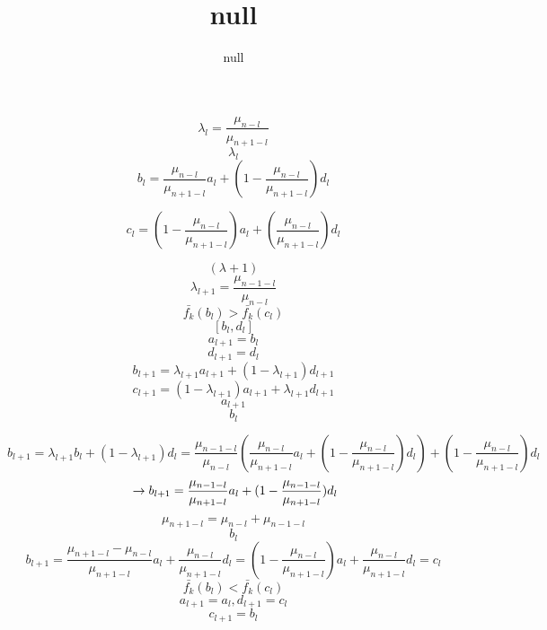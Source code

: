\documentclass{article}
\title{null}
\author{null}
\begin{document}
	\maketitle
	$$\lambda_l=\frac{\mu_{n-l}}{\mu_{n+1-l}}$$
	$$\lambda_l $$
	\begin{equation}
	b_l=\frac{\mu_{n-l}}{\mu_{n+1-l}} a_l+(1-\frac{\mu_{n-l}}{\mu_{n+1-l}})d_l
	\end{equation}
	
	\begin{equation}
	c_l=(1-\frac{\mu_{n-l}}{\mu_{n+1-l}}) a_l+(\frac{\mu_{n-l}}{\mu_{n+1-l}})d_l
	\end{equation}
	
	$$(\lambda+1)$$\newline
	$$\lambda_{l+1}=\frac{\mu_{n-1-l}}{\mu_{n-l}}$$
	$$\bar{f_k}(b_l)>\bar{f_k}(c_l)$$
	$$[b_l,d_l]$$
	$$a_{l+1}=b_l$$
	$$d_{l+1}=d_l$$
	$$b_{l+1}=\lambda_{l+1}a_{l+1}+(1-\lambda_{l+1})d_{l+1}$$
	$$c_{l+1}=(1-\lambda_{l+1})a_{l+1}+\lambda_{l+1}d_{l+1}$$
	$$a_{l+1}$$
	$$b_l$$
	
	$$
	b_{l+1}=\lambda_{l+1} b_l+(1-\lambda_{l+1})d_l=\frac{\mu_{n-1-l}}{\mu_{n-l}}(\frac{\mu_{n-l}}{\mu_{n+1-l}}a_l+(1-\frac{\mu_{n-l}}{\mu_{n+1-l}})d_l)+(1-\frac{\mu_{n-l}}{\mu_{n+1-l}})d_l$$ $$\newline\centering \rightarrow b_{l+1}=\frac{\mu_{n-1-l}}{\mu_{n+1-l}} a_l+(1-\frac{\mu_{n-1-l}}{\mu_{n+1-l}})d_l
	$$
	$$\mu_{n+1-l}=\mu_{n-l}+\mu_{n-1-l}$$
	$$b_l$$
	\begin{equation}
	b_{l+1}=\frac{\mu_{n+1-l}-\mu_{n-l}}{\mu_{n+1-l}}a_l+\frac{\mu_{n-l}}{\mu_{n+1-l}} d_l=(1-\frac{\mu_{n-l}}{\mu_{n+1-l}})a_l+\frac{\mu_{n-l}}{\mu_{n+1-l}}d_l=c_l
	\end{equation}
		$$\bar{f_k}(b_l)<\bar{f_k}(c_l)$$
		$$a_{l+1}=a_l,d_{l+1}=c_l$$
		$$c_{l+1}=b_l$$
\end{document}
